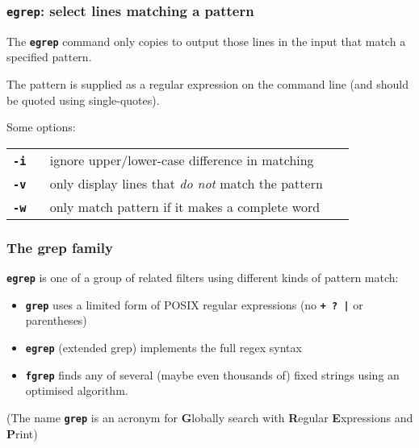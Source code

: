 \begin{frame}[shrink]
\frametitle{\textbf{\tt{egrep}}: select lines matching a pattern}
The \textbf{\tt{egrep}} command only copies to output those lines in the input
that match a specified pattern.

The pattern is supplied as a regular expression on the command line
{\small (and should be quoted using single-quotes)}.

Some options:


\begin{center}
\begin{tabular}{lll}

  \begin{minipage}{1cm}{\bf{\textbf{\tt{-i}}}} ~\end{minipage}
   & \begin{minipage}{18cm}ignore upper/lower-case difference in matching~\end{minipage}
\\[1ex]

  \begin{minipage}{1cm}{\bf{\textbf{\tt{-v}}}} ~\end{minipage}
   & \begin{minipage}{18cm}only display lines that {\em{do not}} match the pattern~\end{minipage}
\\[1ex]

  \begin{minipage}{1cm}{\bf{\textbf{\tt{-w}}}} ~\end{minipage}
   & \begin{minipage}{18cm}only match pattern if it makes a complete word~\end{minipage}
\\[1ex]
\end{tabular}
\end{center}


\end{frame}

\begin{frame}
\frametitle{The grep family}

\textbf{\tt{egrep}} is one of a group of related filters
using different kinds of pattern match:

\begin{itemize}
\item  \textbf{\tt{grep}} uses a limited form of POSIX regular expressions
(no \textbf{\tt{+ ? |}} or parentheses)
\item \textbf{\tt{egrep}} (extended grep) implements the full regex syntax
\item \textbf{\tt{fgrep}} finds any of several (maybe even thousands of)
fixed strings using an optimised algorithm.
\end{itemize}

{\small (The name \textbf{\tt{grep}} is an acronym for {\bf{G}}lobally search with {\bf{R}}egular {\bf{E}}xpressions and {\bf{P}}rint)}

\end{frame}


